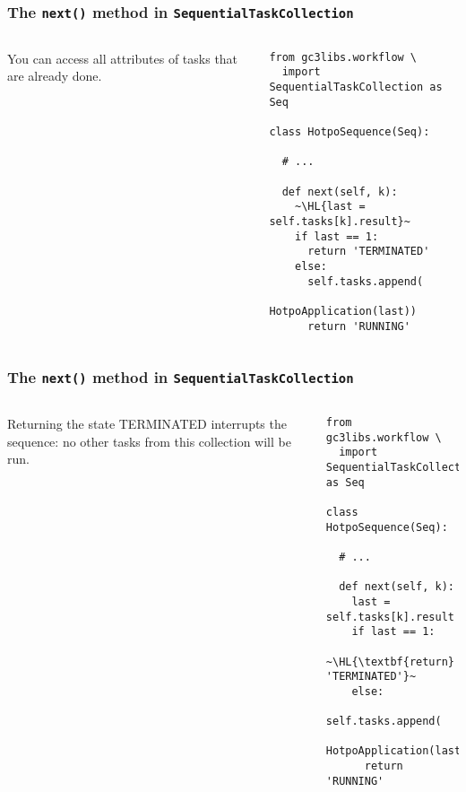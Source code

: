 \documentclass[english,serif,mathserif,xcolor=pdftex,dvipsnames,table]{beamer}
\begin{document}
\begin{frame}[fragile]
  \frametitle{The \texttt{next()} method in \texttt{SequentialTaskCollection}}
  \label{sec:14}

  \begin{columns}
    You can access all attributes of tasks that are already done.

    \begin{lstlisting}[basicstyle=\ttfamily\footnotesize]
from gc3libs.workflow \
  import SequentialTaskCollection as Seq

class HotpoSequence(Seq):

  # ...

  def next(self, k):
    ~\HL{last = self.tasks[k].result}~
    if last == 1:
      return 'TERMINATED'
    else:
      self.tasks.append(
        HotpoApplication(last))
      return 'RUNNING'
    \end{lstlisting}
  \end{columns}
\end{frame}


\begin{frame}[fragile]
  \frametitle{The \texttt{next()} method in \texttt{SequentialTaskCollection}}
  \label{sec:14}

  \begin{columns}
    Returning the state TERMINATED interrupts the
    sequence: no other tasks from this collection will be run.

    \begin{lstlisting}[basicstyle=\ttfamily\footnotesize]
from gc3libs.workflow \
  import SequentialTaskCollection as Seq

class HotpoSequence(Seq):

  # ...

  def next(self, k):
    last = self.tasks[k].result
    if last == 1:
      ~\HL{\textbf{return} 'TERMINATED'}~
    else:
      self.tasks.append(
        HotpoApplication(last))
      return 'RUNNING'
    \end{lstlisting}
  \end{columns}
\end{frame}
\end{document}
